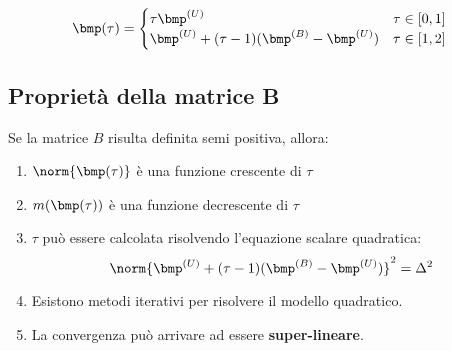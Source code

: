 \documentclass[\main/main.tex]{subfiles}
\begin{document}
\[
    \bmp(\tau) = \begin{cases}
        \tau \bmp^{(U)}                                 & \tau \in [0,1] \\
        \bmp^{(U)} + (\tau -1)(\bmp^{(B)} - \bmp^{(U)}) & \tau \in [1,2]
    \end{cases}
\]

\subsection{Proprietà della matrice B}
Se la matrice \(B\) risulta definita semi positiva, allora:

\begin{enumerate}
    \item \(\norm{\bmp(\tau)}\) è una funzione crescente di \(\tau \)
    \item \(m(\bmp(\tau))\) è una funzione decrescente di \(\tau \)
    \item \(\tau \) può essere calcolata risolvendo l'equazione scalare quadratica: \[
              \norm{\bmp^{(U)} + (\tau -1)(\bmp^{(B)}-\bmp^{(U)})}^2 = \Delta^2
          \]
    \item Esistono metodi iterativi per risolvere il modello quadratico.
    \item La convergenza può arrivare ad essere \textbf{super-lineare}.
\end{enumerate}
\end{document}
